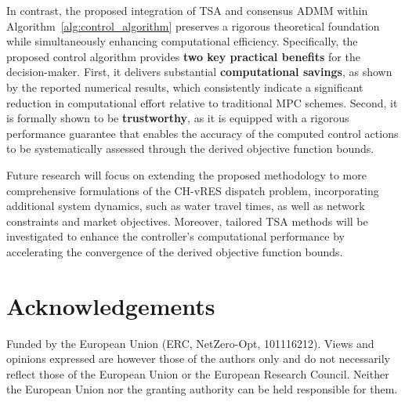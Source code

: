 \documentclass[a4paper,fleqn]{cas-sc}
\begin{document}
In contrast, the proposed integration of TSA and consensus ADMM within Algorithm~\ref{alg:control_algorithm} preserves a rigorous theoretical foundation while simultaneously enhancing computational efficiency.
Specifically, the proposed control algorithm provides \textbf{two key practical benefits} for the decision-maker. 
First, it delivers substantial \textbf{computational savings}, as shown by the reported numerical results, which consistently indicate a significant reduction in computational effort relative to traditional MPC schemes. 
Second, it is formally shown to be \textbf{trustworthy}, as it is equipped with a rigorous performance guarantee that enables the accuracy of the computed control actions to be systematically assessed through the derived objective function bounds.

Future research will focus on extending the proposed methodology to more comprehensive formulations of the CH-vRES dispatch problem, incorporating additional system dynamics, such as water travel times, as well as network constraints and market objectives.
Moreover, tailored TSA methods will be investigated to enhance the controller's computational performance by accelerating the convergence of the derived objective function bounds.

\section*{Acknowledgements}
Funded by the European Union (ERC, NetZero-Opt, 101116212). Views and opinions expressed are however those of the authors only and do not necessarily reflect those of the European Union or the European Research Council. Neither the European Union nor the granting authority can be held responsible for them.

\printcredits

%
%





\end{document}
